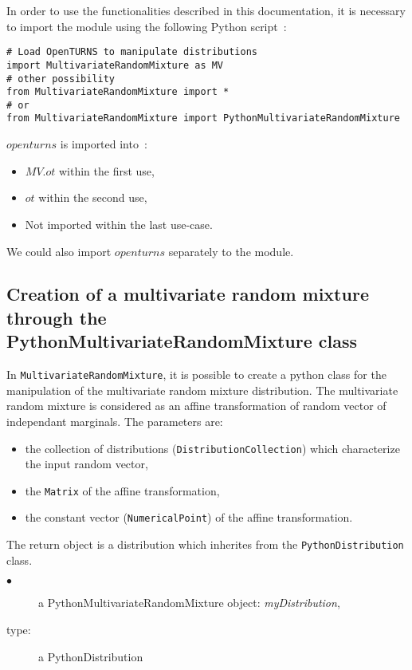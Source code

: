 In order to use the functionalities described in this documentation, it is necessary to import the module 
using the following Python script~:

\begin{lstlisting}
# Load OpenTURNS to manipulate distributions
import MultivariateRandomMixture as MV
# other possibility
from MultivariateRandomMixture import *
# or
from MultivariateRandomMixture import PythonMultivariateRandomMixture
\end{lstlisting}
$openturns$ is imported into~: 
\begin{itemize}
   \item $MV.ot$ within the first use,
   \item $ot$ within the second use,
   \item Not imported within the last use-case.
\end{itemize}

We could also import $openturns$ separately to the module.


\subsection{Creation of a multivariate random mixture through the PythonMultivariateRandomMixture class} \label{MVRM}

In \texttt{MultivariateRandomMixture}, it is possible to create a python class for the manipulation of the multivariate random mixture distribution.
The multivariate random mixture is considered as an affine transformation of random vector of independant marginals. 
The parameters are:
\begin{itemize}
 \item the collection of distributions (\texttt{DistributionCollection}) which characterize the input random vector,
 \item the \texttt{Matrix} of the affine transformation, 
 \item the constant vector (\texttt{NumericalPoint}) of the affine transformation.
\end{itemize}

The return object is a distribution which inherites from the \texttt{PythonDistribution} class.\\
{
  \begin{description}
  \item[$\bullet$] a PythonMultivariateRandomMixture object: \textit{myDistribution},
  \item[type:] a PythonDistribution
  \end{description}
}
\espace

